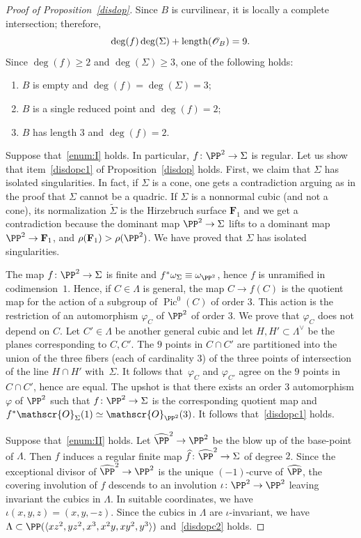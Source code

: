 \documentclass[JEP,XML,SOM,Unicode, NoEqCountersInSection,NoFloatCountersInSection]{cedram}
\let\mathcal\mathscr
\theoremstyle{definition}
\newcommand\F{{\mathbf F}}
\newcommand\cO{\mathcal{O}}\let\OO\cO
\let\wh\widehat
\let\wt\widetilde
\let\la\langle
\let\ra\rangle
\let\cong\simeq
\DeclareMathOperator{\len}{length}
\DeclareMathOperator{\Pic}{Pic}
\begin{document}
\begin{proof}[Proof of Proposition~\ref{disdop}]
Since $B$ is curvilinear, it is locally a complete intersection; therefore,\vspace*{-3pt}\enlargethispage{1\baselineskip}%
\[
\deg( f)\deg (\Sigma)+\len(\cO_{B})=9.\vspace*{-3pt}
\]
Since $\deg (f)\ge 2$ and $\deg( \Sigma)\ge 3$, one of the following holds:
\begin{enumerate}\renewcommand{\theenumi}{\Roman{enumi}}
\item\label{enum:I}
$ B$ is empty and $\deg( f)=\deg(\Sigma)=3$;
\item\label{enum:II}
$ B$ is a single reduced point and $\deg( f)=2$;
\item\label{enum:III}
$ B$ has length $3$ and $\deg( f)=2$.
\end{enumerate}
Suppose that~\eqref{enum:I} holds. In particular, $f\colon \PP^2 \to\Sigma$ is regular. Let us show that item~\eqref{disdopc1} of Proposition~\ref{disdop} holds. First, we claim that $\Sigma$ has isolated singularities. In fact, if $\Sigma$ is a cone, one gets a contradiction arguing as in the proof that $\Sigma$ cannot be a quadric. If $\Sigma$ is a nonnormal cubic (and not a cone), its normalization $\wt{\Sigma}$ is the Hirzebruch surface $\F_1$ and we get a contradiction because the dominant map $\PP^2\to\Sigma$ lifts to a dominant map $\PP^2\to \F_1$, and $\rho(\F_1)>\rho(\PP^2)$.
We have proved that $\Sigma$ has isolated singularities.

The map $f\colon\PP^2\to\Sigma$ is finite and $f^{*}\omega_{\Sigma}\equiv\omega_{\PP^2}$, hence $f$ is unramified in codimension~$1$. Hence, if $C\in\Lambda$ is general, the map $C\to f(C)$ is the quotient map for the action of a subgroup of $\Pic^0(C)$ of order $3$. This action is the restriction of an automorphism $\varphi_C$ of $\PP^2$ of order $3$. We prove that $\varphi_C$ does not depend on $C$. Let $C'\in\Lambda$ be another general cubic and let $H,H'\subset\Lambda^{\!\vee}$ be the planes corresponding to $C,C'$. The $9$ points in $C\cap C'$ are partitioned into the union of the three fibers (each of cardinality $3$) of the three points of intersection of the line $H\cap H'$ with~$\Sigma$. It follows that~$\varphi_C$ and $\varphi_{C'}$ agree on the $9$ points in $C\cap C'$, hence are equal. The upshot is that there exists an order $3$ automorphism $\varphi$ of $\PP^2$ such that $f\colon\PP^2\to\Sigma$ is the corresponding quotient map and $f^{*}\cO_{\Sigma}(1)\cong\cO_{\PP^2}(3)$. It follows that~\eqref{disdopc1} holds.

Suppose that~\eqref{enum:II} holds. Let $\wh{\PP}^2\to\PP^2$ be the blow up of the base-point of $\Lambda$. Then $f$ induces a regular finite map
$\wh{f}\colon \wh{\PP}^2\to \Sigma$ of degree $2$. Since the exceptional divisor of $\wh{\PP}^2\to\PP^2$ is the unique $(-1)$-curve of $\wh{\PP}$, the covering involution of $\wh{f}$ descends to an involution $\iota\colon\PP^2\to\PP^2$ leaving invariant the cubics in $\Lambda$. In suitable coordinates, we have
$\iota(x,y,z)=(x,y,-z)$. Since the cubics in $\Lambda$ are ${\iota}$-invariant, we have
$\Lambda\subset\PP(\la xz^2,yz^2,x^3,x^2y,xy^2,y^3\ra)$ and~\eqref{disdopc2} holds.


\end{proof}
\end{document}
